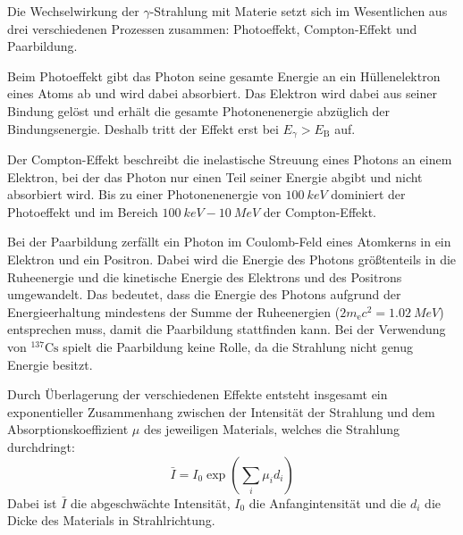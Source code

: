 Die Wechselwirkung der $\gamma$-Strahlung mit Materie setzt sich im Wesentlichen aus drei verschiedenen Prozessen zusammen: Photoeffekt, Compton-Effekt und Paarbildung.

Beim Photoeffekt gibt das Photon seine gesamte Energie an ein Hüllenelektron eines Atoms ab und wird dabei absorbiert. Das Elektron wird dabei aus seiner
Bindung gelöst und erhält die gesamte Photonenenergie abzüglich der Bindungsenergie. Deshalb tritt der Effekt erst bei $E_\gamma > E_\text{B}$ auf.

Der Compton-Effekt beschreibt die inelastische Streuung eines Photons an einem Elektron, bei der das Photon nur einen Teil seiner Energie abgibt und nicht
absorbiert wird. Bis zu einer Photonenenergie von $\SI{100}{keV}$ dominiert der Photoeffekt und im Bereich $\SI{100}{keV} - \SI{10}{MeV}$ der
Compton-Effekt.

Bei der Paarbildung zerfällt ein Photon im Coulomb-Feld eines Atomkerns in ein Elektron und ein Positron. Dabei wird die Energie des Photons größtenteils in die Ruheenergie
und die kinetische Energie des Elektrons und des Positrons umgewandelt. Das bedeutet, dass die Energie des Photons aufgrund der Energieerhaltung mindestens der Summe der
Ruheenergien ($2m_\text{e}c^2 = \SI{1.02}{MeV}$) entsprechen muss, damit die Paarbildung stattfinden kann. Bei der Verwendung von ${}^{137}\text{Cs}$ spielt die Paarbildung
keine Rolle, da die Strahlung nicht genug Energie besitzt.

Durch Überlagerung der verschiedenen Effekte entsteht insgesamt ein exponentieller Zusammenhang zwischen der Intensität der Strahlung und dem
Absorptionskoeffizient $\mu$ des jeweiligen Materials, welches die Strahlung durchdringt:
\begin{equation}
  \bar{I} = I_0 \exp\left( \sum_i \mu_i d_i \right)
  \label{eq:N}
\end{equation}
Dabei ist $\bar{I}$ die abgeschwächte Intensität, $I_0$ die Anfangintensität und die $d_i$ die Dicke des Materials in Strahlrichtung.

